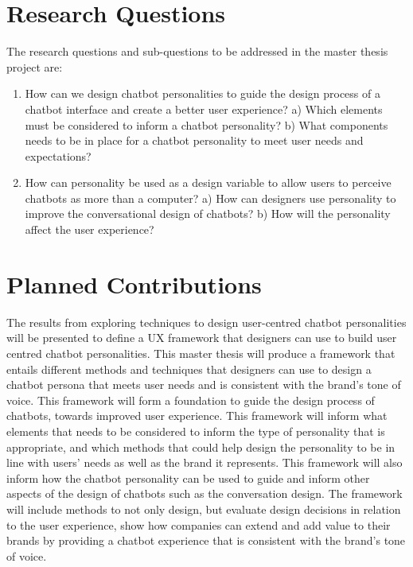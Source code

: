 \section{Research Questions}
The research questions and sub-questions to be addressed in the master thesis project are:

\begin{enumerate}
    \item How can we design chatbot personalities to guide the design process of a chatbot interface and create a better user experience?
    \subitem a) Which elements must be considered to inform a chatbot personality?
    \subitem b) What components needs to be in place for a chatbot personality to meet user needs and expectations?
    \item How can personality be used as a design variable to allow users to perceive chatbots as more than a computer?
        \subitem a) How can designers use personality to improve the conversational design of chatbots?
        \subitem b) How will the personality affect the user experience?
        \end{enumerate}

\section{Planned Contributions}
The results from exploring techniques to design user-centred chatbot personalities will be presented to define a UX framework that designers can use to build user centred chatbot personalities. This master thesis will produce a framework that entails different methods and techniques that designers can use to design a chatbot persona that meets user needs and is consistent with the brand's tone of voice. This framework will form a foundation to guide the design process of chatbots, towards improved user experience. This framework will inform what elements that needs to be considered to inform the type of personality that is appropriate, and which methods that could help design the personality to be in line with users' needs as well as the brand it represents. This framework will also inform how the chatbot personality can be used to guide and inform other aspects of the design of chatbots such as the conversation design. The framework will include methods to not only design, but evaluate design decisions in relation to the user experience, show how companies can extend and add value to their brands by providing a chatbot experience that is consistent with the brand's tone of voice.